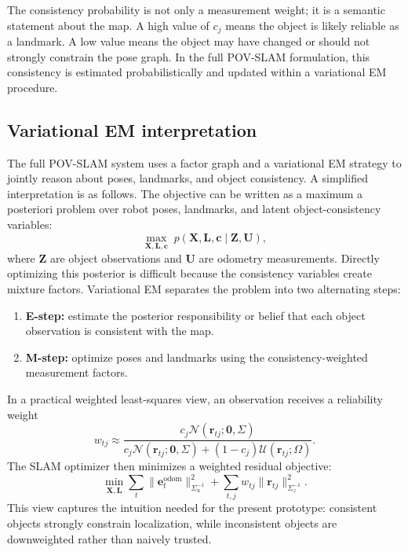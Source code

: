 ﻿\documentclass[11pt]{article}
\newcommand{\Normal}{\mathcal{N}}
\newcommand{\Uniform}{\mathcal{U}}
\begin{document}
The consistency probability is not only a measurement weight; it is a semantic statement about the map. A high value of $c_j$ means the object is likely reliable as a landmark. A low value means the object may have changed or should not strongly constrain the pose graph. In the full POV-SLAM formulation, this consistency is estimated probabilistically and updated within a variational EM procedure.

\subsection{Variational EM interpretation}
The full POV-SLAM system uses a factor graph and a variational EM strategy to jointly reason about poses, landmarks, and object consistency. A simplified interpretation is as follows. The objective can be written as a maximum a posteriori problem over robot poses, landmarks, and latent object-consistency variables:
\begin{equation}
    \max_{\mathbf{X}, \mathbf{L}, \mathbf{c}} \; p(\mathbf{X}, \mathbf{L}, \mathbf{c} \mid \mathbf{Z}, \mathbf{U}),
\end{equation}
where $\mathbf{Z}$ are object observations and $\mathbf{U}$ are odometry measurements. Directly optimizing this posterior is difficult because the consistency variables create mixture factors. Variational EM separates the problem into two alternating steps:
\begin{enumerate}[leftmargin=*]
    \item \textbf{E-step:} estimate the posterior responsibility or belief that each object observation is consistent with the map.
    \item \textbf{M-step:} optimize poses and landmarks using the consistency-weighted measurement factors.
\end{enumerate}

In a practical weighted least-squares view, an observation receives a reliability weight
\begin{equation}
    w_{tj} \approx \frac{c_j \Normal(\mathbf{r}_{tj};\mathbf{0},\Sigma)}{c_j \Normal(\mathbf{r}_{tj};\mathbf{0},\Sigma) + (1-c_j)\Uniform(\mathbf{r}_{tj};\Omega)}.
\end{equation}
The SLAM optimizer then minimizes a weighted residual objective:
\begin{equation}
    \min_{\mathbf{X}, \mathbf{L}} \sum_t \|\mathbf{e}^{\mathrm{odom}}_t\|^2_{\Sigma_u^{-1}}
    + \sum_{t,j} w_{tj}\|\mathbf{r}_{tj}\|^2_{\Sigma_z^{-1}}.
\end{equation}
This view captures the intuition needed for the present prototype: consistent objects strongly constrain localization, while inconsistent objects are downweighted rather than naively trusted.
\end{document}
